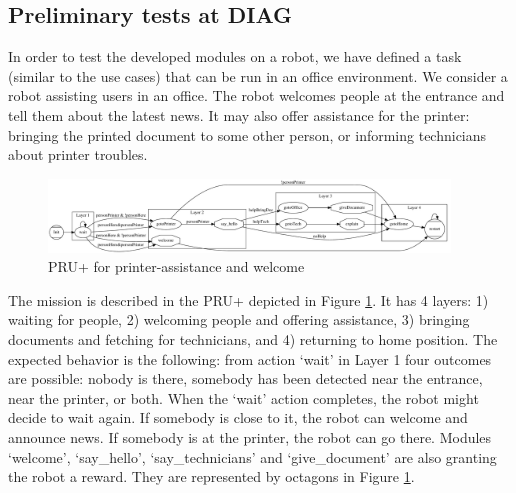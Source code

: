 \subsection{Preliminary tests at DIAG}

In order to test the developed modules on a robot, we have defined a task (similar to the \coaches use cases) that can be run in an office environment.
We consider a robot assisting users in an office. The robot welcomes people at the entrance and tell them about the latest news. It may also offer assistance for the printer: bringing the printed document to some other person, or informing technicians about printer troubles.

\begin{figure}
\centering
\includegraphics[width=0.95\textwidth]{fig/PRU}
\caption{PRU+ for printer-assistance and welcome}
\label{fig:pru}
\end{figure}

The mission is described in the PRU+ depicted in Figure \ref{fig:pru}. It has 4 layers: 1) waiting for people, 2) welcoming people and offering assistance, 3) bringing documents and fetching for technicians, and 4) returning to home position.
The expected behavior is the following:
from action `wait' in Layer 1 four outcomes are possible: nobody is there, somebody has been detected near the entrance, near the printer, or both. When the `wait' action completes, the robot might decide to wait again. If somebody is close to it, the robot can welcome and announce news. If somebody is at the printer, the robot can go there.
Modules `welcome', `say\_hello', `say\_technicians' and `give\_document' are also granting the robot a reward. They are represented by octagons in Figure  \ref{fig:pru}.

